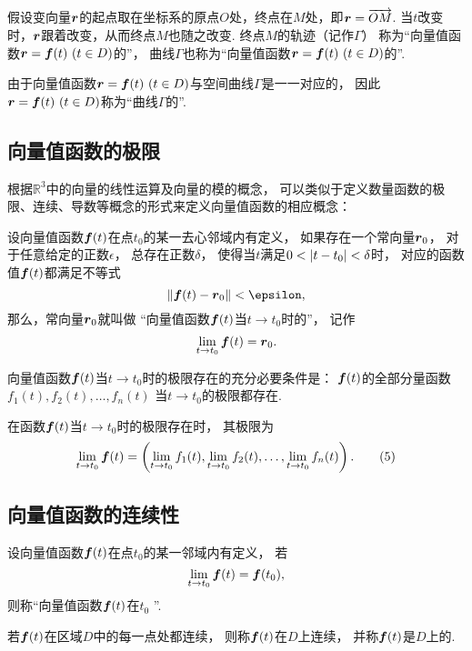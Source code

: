 假设变向量\(\boldsymbol{r}\)的起点取在坐标系的原点\(O\)处，终点在\(M\)处，即\(\boldsymbol{r}=\overrightarrow{OM}\).
当\(t\)改变时，\(\boldsymbol{r}\)跟着改变，从而终点\(M\)也随之改变.
终点\(M\)的轨迹（记作\(\Gamma\)）
称为“向量值函数\(\boldsymbol{r}=\boldsymbol{f}(t)\ (t \in D)\)的”，
曲线\(\Gamma\)也称为“向量值函数\(\boldsymbol{r}=\boldsymbol{f}(t)\ (t \in D)\)的”.

由于向量值函数\(\boldsymbol{r}=\boldsymbol{f}(t)\ (t \in D)\)与空间曲线\(\Gamma\)是一一对应的，
因此\(\boldsymbol{r}=\boldsymbol{f}(t)\ (t \in D)\)称为“曲线\(\Gamma\)的”.

\subsection{向量值函数的极限}
根据\(\mathbb{R}^3\)中的向量的线性运算及向量的模的概念，
可以类似于定义数量函数的极限、连续、导数等概念的形式来定义向量值函数的相应概念：
\begin{definition}
设向量值函数\(\boldsymbol{f}(t)\)在点\(t_0\)的某一去心邻域内有定义，
如果存在一个常向量\(\boldsymbol{r}_0\)，
对于任意给定的正数\(\epsilon\)，
总存在正数\(\delta\)，
使得当\(t\)满足\(0 < \abs{t-t_0} < \delta\)时，
对应的函数值\(\boldsymbol{f}(t)\)都满足不等式\[
	\norm{\vb{f}(t)-\vb{r}_0} < \epsilon,
\]
那么，常向量\(\boldsymbol{r}_0\)就叫做
“向量值函数\(\boldsymbol{f}(t)\)当\(t \to t_0\)时的”，
记作\[
	\lim_{t \to t_0} \boldsymbol{f}(t) = \boldsymbol{r}_0.
\]
\end{definition}

\begin{theorem}
向量值函数\(\boldsymbol{f}(t)\)当\(t \to t_0\)时的极限存在的充分必要条件是：
\(\boldsymbol{f}(t)\)的全部分量函数\(f_1(t),f_2(t),\dotsc,f_n(t)\)
当\(t \to t_0\)的极限都存在.

在函数\(\boldsymbol{f}(t)\)当\(t \to t_0\)时的极限存在时，
其极限为\begin{gather}
	\lim_{t \to t_0} \vb{f}(t)
	= \left(
			\lim_{t \to t_0} f_1(t),
			\lim_{t \to t_0} f_2(t),
			\dotsc,
			\lim_{t \to t_0} f_n(t)
		\right).
	\tag5
\end{gather}
\end{theorem}

\subsection{向量值函数的连续性}
\begin{definition}[向量值函数的连续性]
设向量值函数\(\boldsymbol{f}(t)\)在点\(t_0\)的某一邻域内有定义，
若\[
	\lim_{t \to t_0} \boldsymbol{f}(t) = \boldsymbol{f}(t_0),
\]
则称“向量值函数\(\boldsymbol{f}(t)\)在\(t_0\) ”.

若\(\boldsymbol{f}(t)\)在区域\(D\)中的每一点处都连续，
则称\(\boldsymbol{f}(t)\)在\(D\)上连续，
并称\(\boldsymbol{f}(t)\)是\(D\)上的.
\end{definition}

